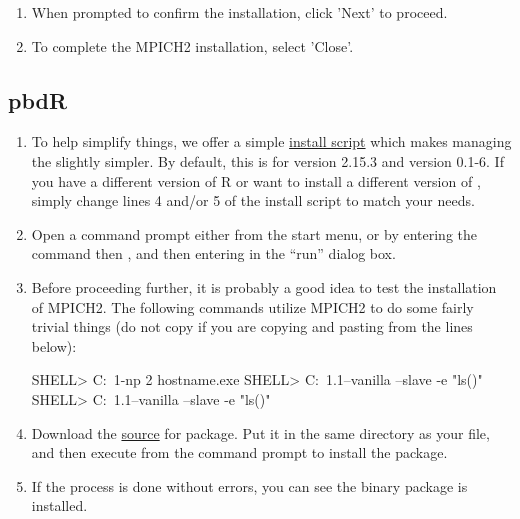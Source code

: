 \begin{enumerate}
  \item When prompted to confirm the installation, click 'Next' to proceed.
  \item To complete the MPICH2 installation, select 'Close'.
\end{enumerate}






\subsection{pbdR}
\begin{enumerate}
  \item To help simplify things, we offer a simple \href{windows/build_pbdMPI.bat}{install script} which makes managing the  slightly simpler.  By default, this is for  version 2.15.3 and  version 0.1-6.  If you have a different version of R or want to install a different version of , simply change lines 4 and/or 5 of the install script to match your needs.
  \item Open a command prompt either from the start menu, or by entering the command  then , and then entering  in the ``run'' dialog box.
  \item Before proceeding further, it is probably a good idea to test the installation of MPICH2.  The following commands utilize MPICH2 to do some fairly trivial things (do not copy  if you are copying and pasting from the lines below):
  \begin{Code}
SHELL> C:\PROGRA~1\bin\mpiexec -np 2 hostname.exe
SHELL> C:\PROGRA~1\R{}.1\bin\R --vanilla --slave -e "ls()"
SHELL> C:\PROGRA~1\R{}.1\bin\Rscript --vanilla --slave -e "ls()"
  \end{Code}
  \item Download the \href{http://cran.r-project.org/src/contrib/pbdMPI_0.1-6.tar.gz}{source} for \href{http://cran.r-project.org/web/packages/pbdMPI/index.html}{} package.  Put it in the same directory as your  file, and then execute  from the command prompt to install the package.
  \item If the process is done without errors, you can see the binary package is installed. 
\end{enumerate}




